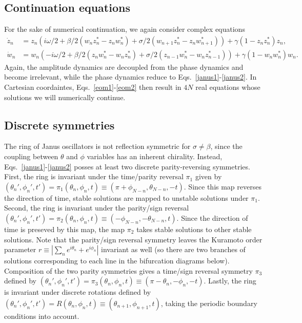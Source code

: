 \documentclass[aps,pre,amsmath,amssymb,floatfix,onecolumn,notitlepage,10pt]{revtex4-1}
\begin{document}
\subsection{Continuation equations}
For the sake of numerical continuation, we again consider complex equations
\begin{align}
\dot z_n &= z_n\left( i\omega/2 + \beta/2\left(w_nz_n^*-z_nw_n^*\right) + \sigma/2\left(w_{n+1}z_n^*-z_nw_{n+1}^*\right)\right) + \gamma\left(1-z_nz_n^*\right)z_n, \label{eom1} \\
\dot w_n &= w_n\left( -i\omega/2 + \beta/2\left(z_nw_n^*-w_nz_n^*\right) + \sigma/2\left(z_{n-1}w_n^*-w_nz_{n-1}^*\right)\right) + \gamma\left(1-w_nw_n^*\right)w_n. \label{eom2}
\end{align}
Again, the amplitude dynamics are decoupled from the phase dynamics and become irrelevant, while the phase dynamics reduce to Eqs.~\eqref{janus1}-\eqref{janus2}. In Cartesian coordaintes, Eqs.~\eqref{eom1}-\eqref{eom2} then result in $4N$ real equations whose solutions we will numerically continue.

\subsection{Discrete symmetries}
The ring of Janus oscillators is not reflection symmetric for $\sigma \neq \beta$, since the coupling between $\theta$ and $\phi$ variables has an inherent chirality. Instead, Eqs.~\eqref{janus1}-\eqref{janus2} posses at least two discrete parity-reversing symmetries. First, the ring is invariant under the time/parity reversal $\pi_1$ given by $(\theta_n',\phi_n',t') = \pi_1(\theta_n,\phi_n,t) \equiv (\pi+\phi_{N-n},\theta_{N-n},-t)$. Since this map reverses the direction of time, stable solutions are mapped to unstable solutions under $\pi_1$.  Second, the ring is invariant under the parity/sign reversal $(\theta_n',\phi_n',t') = \pi_2(\theta_n,\phi_n,t) \equiv (-\phi_{N-n},-\theta_{N-n},t)$. Since the direction of time is preseved by this map, the map $\pi_2$ takes stable solutions to other stable solutions.  Note that the parity/sign reversal symmetry leaves the Kuramoto order parameter $r\equiv \left\lvert \sum_n e^{i\theta_n}+e^{i\phi_n}\right \rvert$ invariant as well (so there are two branches of solutions corresponding to each line in the bifurcation diagrams below). Composition of the two parity symmetries gives a time/sign reversal symmetry $\pi_3$ defined by $(\theta_n',\phi_n',t')=\pi_3(\theta_n,\phi_n,t)\equiv(\pi-\theta_n,-\phi_n,-t)$. Lastly, the ring is invariant under discrete rotations defined by $(\theta_n',\phi_n',t')=R(\theta_n,\phi_n,t)\equiv(\theta_{n+1},\phi_{n+1},t)$, taking the periodic boundary conditions into account.
\end{document}
